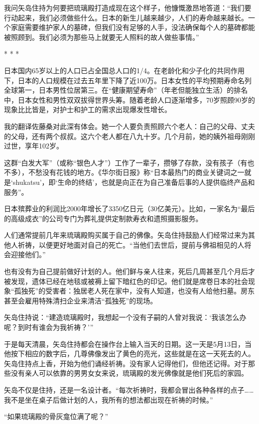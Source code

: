 \documentclass[12pt,oneside]{book}
\begin{document}
\begin{bookref}[frametitle={\cite{好好告别：世界葬礼观察手记}}]
我问矢岛住持为何要把琉璃殿打造成现在这个样子，他慷慨激昂地答道：“我们要行动起来，我们必须做些什么。日本的新生儿越来越少，人们的寿命越来越长。一个家庭需要维护家人的墓碑，但我们没有足够的人手，没法确保每个人的墓碑都能被照顾到。我们必须为那些马上就要无人照料的故人做些事情。”

\begin{center}
* * *
\end{center}
日本国内65岁以上的人口已占全国总人口的1/4。在老龄化和少子化的共同作用下，日本的人口规模在过去五年里下降了近100万。日本女性的平均预期寿命名列全球第一，日本男性位居第三。在“健康期望寿命”（年老但能独立生活）的排名中，日本女性和男性双双拔得世界头筹。随着老龄人口逐渐增多，70岁照顾90岁的现象比比皆是，对护士和护工的需求出现爆发性增长。

我的翻译佐藤桑对此深有体会。她一个人要负责照顾六个老人：自己的父母、丈夫的父母，还有两个叔叔。这六个老人都在八九十岁。几个月前，她的姨外祖母刚刚过世，享年102岁。

这群“白发大军”（或称“银色人才”）工作了一辈子，攒够了存款，没有孩子（有也不多），不愁没有花钱的地方。《华尔街日报》称“日本最热门的商业关键词之一就是‘shukatsu’，即‘生命的终结’，也就是向正在为自己准备后事的人提供临终产品和服务”。

日本殡葬业的利润比2000年增长了3350亿日元（30亿美元）。比如，一家名为“最后的高级成衣”的公司专门为葬礼提供定制款寿衣和遗照摄影服务。

人们通常提前几年来琉璃殿购买属于自己的佛像。矢岛住持鼓励人们经常过来为其他人祈祷，以便更好地面对自己的死亡。“当他们去世后，提前与佛祖相见的人将会迎接他们。”

也有没有为自己提前做好计划的人。他们鲜与亲人往来，死后几周甚至几个月后才被发现，遗体已经在地毯或被褥上留下暗红色的印记。他们就是席卷日本的社会现象“孤独死”的受害者：独居老人死在家中，没有人知道，也没有人给他扫墓。房东甚至会雇用特殊清扫企业来清洁“孤独死”的现场。

矢岛住持说：“建造琉璃殿时，我想起一个没有子嗣的人曾对我说：‘我该怎么办呢？到时有谁会为我祈祷？’”

于是每天清晨，矢岛住持都会在操作台上输入当天的日期。这一天是5月13日，当他按下相应的数字后，几尊佛像发出了黄色的亮光，这些就是在这一天死去的人。矢岛住持点上香，开始为他们诵经祈祷。没有家人记得他们，但他还记得。对于那些没有亲人可以依靠的男男女女来说，琉璃殿的发光佛像就是他们死后的家园。

矢岛不仅是住持，还是一名设计者。“每次祈祷时，我都会冒出各种各样的点子……我不是坐在桌子后做计划的人，我所有的想法都出现在祈祷的时候。”

“如果琉璃殿的骨灰龛位满了呢？”


\end{bookref}
\end{document}

